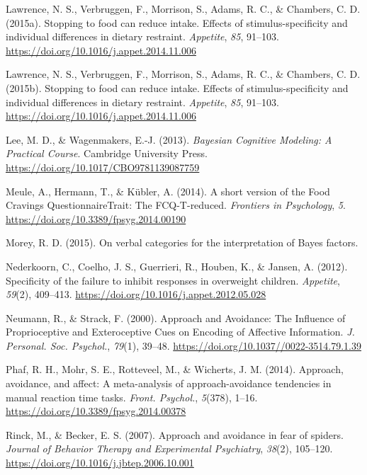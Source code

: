 \documentclass[man,floatsintext]{apa6}
\begin{document}
\leavevmode\hypertarget{ref-lawrence_stopping_2015-3}{}%
Lawrence, N. S., Verbruggen, F., Morrison, S., Adams, R. C., \& Chambers, C. D. (2015a). Stopping to food can reduce intake. Effects of stimulus-specificity and individual differences in dietary restraint. \emph{Appetite}, \emph{85}, 91--103. \url{https://doi.org/10.1016/j.appet.2014.11.006}

\leavevmode\hypertarget{ref-lawrence_stopping_2015}{}%
Lawrence, N. S., Verbruggen, F., Morrison, S., Adams, R. C., \& Chambers, C. D. (2015b). Stopping to food can reduce intake. Effects of stimulus-specificity and individual differences in dietary restraint. \emph{Appetite}, \emph{85}, 91--103. \url{https://doi.org/10.1016/j.appet.2014.11.006}

\leavevmode\hypertarget{ref-lee_bayesian_2013}{}%
Lee, M. D., \& Wagenmakers, E.-J. (2013). \emph{Bayesian Cognitive Modeling: A Practical Course}. Cambridge University Press. \url{https://doi.org/10.1017/CBO9781139087759}

\leavevmode\hypertarget{ref-meule_short_2014}{}%
Meule, A., Hermann, T., \& Kübler, A. (2014). A short version of the Food Cravings QuestionnaireTrait: The FCQ-T-reduced. \emph{Frontiers in Psychology}, \emph{5}. \url{https://doi.org/10.3389/fpsyg.2014.00190}

\leavevmode\hypertarget{ref-richard_d._morey_verbal_2015}{}%
Morey, R. D. (2015). On verbal categories for the interpretation of Bayes factors.

\leavevmode\hypertarget{ref-nederkoorn_specificity_2012}{}%
Nederkoorn, C., Coelho, J. S., Guerrieri, R., Houben, K., \& Jansen, A. (2012). Specificity of the failure to inhibit responses in overweight children. \emph{Appetite}, \emph{59}(2), 409--413. \url{https://doi.org/10.1016/j.appet.2012.05.028}

\leavevmode\hypertarget{ref-neumann_approach_2000}{}%
Neumann, R., \& Strack, F. (2000). Approach and Avoidance: The Influence of Proprioceptive and Exteroceptive Cues on Encoding of Affective Information. \emph{J. Personal. Soc. Psychol.}, \emph{79}(1), 39--48. \url{https://doi.org/10.1037//0022-3514.79.1.39}

\leavevmode\hypertarget{ref-phaf_approach_2014}{}%
Phaf, R. H., Mohr, S. E., Rotteveel, M., \& Wicherts, J. M. (2014). Approach, avoidance, and affect: A meta-analysis of approach-avoidance tendencies in manual reaction time tasks. \emph{Front. Psychol.}, \emph{5}(378), 1--16. \url{https://doi.org/10.3389/fpsyg.2014.00378}

\leavevmode\hypertarget{ref-rinck_approach_2007}{}%
Rinck, M., \& Becker, E. S. (2007). Approach and avoidance in fear of spiders. \emph{Journal of Behavior Therapy and Experimental Psychiatry}, \emph{38}(2), 105--120. \url{https://doi.org/10.1016/j.jbtep.2006.10.001}
\end{document}
